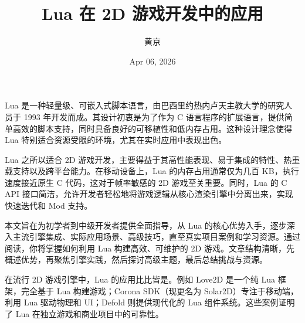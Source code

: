 \title{Lua 在 2D 游戏开发中的应用}
\author{黄京}
\date{Apr 06, 2026}
\maketitle
Lua 是一种轻量级、可嵌入式脚本语言，由巴西里约热内卢天主教大学的研究人员于 1993 年开发而成。其设计初衷是为了作为 C 语言程序的扩展语言，提供简单高效的脚本支持，同时具备良好的可移植性和低内存占用。这种设计理念使得 Lua 特别适合资源受限的环境，尤其在实时应用中表现出色。\par
Lua 之所以适合 2D 游戏开发，主要得益于其高性能表现、易于集成的特性、热重载支持以及跨平台能力。在移动设备上，Lua 的内存占用通常仅为几百 KB，执行速度接近原生 C 代码，这对于帧率敏感的 2D 游戏至关重要。同时，Lua 的 C API 接口简洁，允许开发者轻松地将游戏逻辑从核心渲染引擎中分离出来，实现快速迭代和 Mod 支持。\par
本文旨在为初学者到中级开发者提供全面指导，从 Lua 的核心优势入手，逐步深入主流引擎集成、实际应用场景、高级技巧，直至真实项目案例和学习资源。通过阅读，你将掌握如何利用 Lua 构建高效、可维护的 2D 游戏。文章结构清晰，先概述优势，再聚焦引擎实践，然后探讨高级主题，最后总结挑战与资源。\par
在流行 2D 游戏引擎中，Lua 的应用比比皆是。例如 Love2D 是一个纯 Lua 框架，完全基于 Lua 构建游戏；Corona SDK（现更名为 Solar2D）专注于移动端，利用 Lua 驱动物理和 UI；Defold 则提供现代化的 Lua 组件系统。这些案例证明了 Lua 在独立游戏和商业项目中的可靠性。\par
